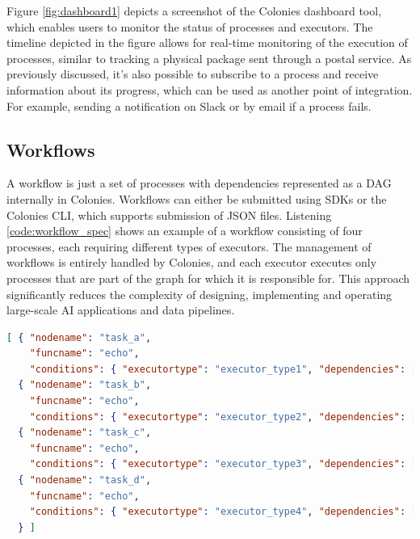 \documentclass{article}
\begin{document}
Figure \ref{fig:dashboard1} depicts a screenshot of the Colonies dashboard tool, which enables users to monitor the status of processes and executors. The timeline depicted in the figure allows for real-time monitoring of the execution of processes, similar to tracking a physical package sent through a postal service. As previously discussed, it's also possible to subscribe to a process and receive information about its progress, which can be used as another point of integration. For example, sending a notification on Slack or by email if a process fails.

\subsection{Workflows}
A workflow is just a set of processes with dependencies represented as a DAG internally in Colonies. Workflows can either be submitted using SDKs or the Colonies CLI, which supports submission of JSON files. Listening \ref{code:workflow_spec} shows an example of a workflow consisting of four processes, each requiring different types of executors. The management of workflows is entirely handled by Colonies, and each executor executes only processes that are part of the graph for which it is responsible for. This approach significantly reduces the complexity of designing, implementing and operating large-scale AI applications and data pipelines. 

\begin{lstlisting}[basicstyle=\small, label=code:workflow_spec, language=json, basicstyle=\small, caption=Example of a workflow expressed in JSON.]
[ { "nodename": "task_a",
    "funcname": "echo",
    "conditions": { "executortype": "executor_type1", "dependencies": [] } },
  { "nodename": "task_b",
    "funcname": "echo",
    "conditions": { "executortype": "executor_type2", "dependencies": ["task_a"] } },
  { "nodename": "task_c",
    "funcname": "echo",
    "conditions": { "executortype": "executor_type3", "dependencies": ["task_a"] } },
  { "nodename": "task_d",
    "funcname": "echo",
    "conditions": { "executortype": "executor_type4", "dependencies": ["task_b", "task_c"] }
  } ]
\end{lstlisting}
\end{document}
